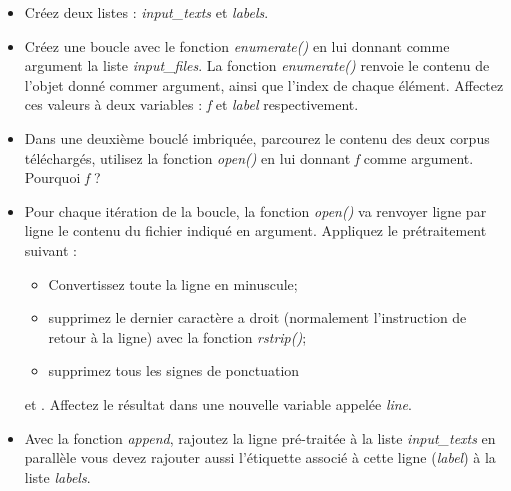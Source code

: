 \begin{itemize}
	\item Créez deux listes : \textit{input\_texts} et \textit{labels}.
	\item Créez une boucle avec le fonction \textit{enumerate()} en lui donnant comme argument la liste \textit{input\_files}. La fonction \textit{enumerate()} renvoie le contenu de l'objet donné commer argument, ainsi que l'index de chaque élément. Affectez ces valeurs à deux variables : \textit{f} et \textit{label} respectivement.
	\item Dans une deuxième bouclé imbriquée, parcourez le contenu des deux corpus téléchargés, utilisez la fonction \textit{open()} en lui donnant \textit{f} comme argument. Pourquoi \textit{f} ?
	\item Pour chaque itération de la boucle, la fonction \textit{open()} va renvoyer ligne par ligne le contenu du fichier indiqué en argument. Appliquez le prétraitement suivant :
	\begin{itemize}
		\item Convertissez toute la ligne en minuscule;
		\item supprimez le dernier caractère a droit (normalement l'instruction de retour à la ligne) avec la fonction \textit{rstrip()};
		\item supprimez tous les signes de ponctuation
	\end{itemize}
	 et . Affectez le résultat dans une nouvelle variable appelée \textit{line}.
	\item Avec la fonction \textit{append}, rajoutez la ligne pré-traitée à la liste \textit{input\_texts} en parallèle vous devez rajouter aussi l'étiquette associé à cette ligne (\textit{label}) à la liste \textit{labels}.
\end{itemize}




